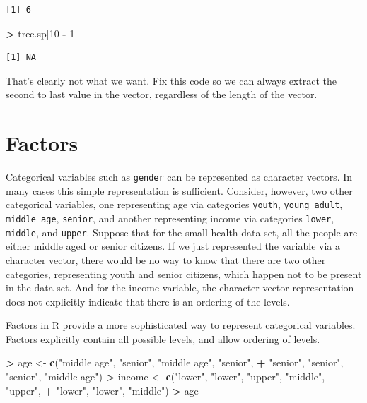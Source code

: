 \documentclass[]{krantz}
\makeatletter
\newenvironment{Shaded}{\begin{snugshade}}{\end{snugshade}}
\newcommand{\DecValTok}[1]{\textcolor[rgb]{0.06,0.06,0.06}{#1}}
\newcommand{\KeywordTok}[1]{\textcolor[rgb]{0.27,0.27,0.27}{\textbf{#1}}}
\newcommand{\NormalTok}[1]{#1}
\newcommand{\OperatorTok}[1]{\textcolor[rgb]{0.43,0.43,0.43}{\textbf{#1}}}
\newcommand{\StringTok}[1]{\textcolor[rgb]{0.5,0.5,0.5}{#1}}
\newenvironment{kframe}{%
\medskip{}
\setlength{\fboxsep}{.8em}
 \def\at@end@of@kframe{}%
 \ifinner\ifhmode%
  \def\at@end@of@kframe{\end{minipage}}%
  \begin{minipage}{\columnwidth}%
 \fi\fi%
 \def\FrameCommand##1{\hskip\@totalleftmargin \hskip-\fboxsep
 \colorbox{shadecolor}{##1}\hskip-\fboxsep
     \hskip-\linewidth \hskip-\@totalleftmargin \hskip\columnwidth}%
 \MakeFramed {\advance\hsize-\width
   \@totalleftmargin\z@ \linewidth\hsize
   \@setminipage}}%
 {\par\unskip\endMakeFramed%
 \at@end@of@kframe}
\renewenvironment{Shaded}{\begin{kframe}}{\end{kframe}}
\makeatother
\begin{document}
\begin{verbatim}
[1] 6
\end{verbatim}

\begin{Shaded}
\begin{Highlighting}[]
\OperatorTok{>}\StringTok{ }\NormalTok{tree.sp[}\DecValTok{10} \OperatorTok{-}\StringTok{ }\DecValTok{1}\NormalTok{]}
\end{Highlighting}
\end{Shaded}

\begin{verbatim}
[1] NA
\end{verbatim}

That's clearly not what we want. Fix this code so we can always extract the second to last value in the vector, regardless of the length of the vector.

\hypertarget{factors}{%
\section{Factors}\label{factors}}

Categorical variables such as \texttt{gender} can be represented as character vectors. In many cases this simple representation is sufficient. Consider, however, two other categorical variables, one representing age via categories \texttt{youth}, \texttt{young\ adult}, \texttt{middle\ age}, \texttt{senior}, and another representing income via categories \texttt{lower}, \texttt{middle}, and \texttt{upper}. Suppose that for the small health data set, all the people are either middle aged or senior citizens. If we just represented the variable via a character vector, there would be no way to know that there are two other categories, representing youth and senior citizens, which happen not to be present in the data set. And for the income variable, the character vector representation does not explicitly indicate that there is an ordering of the levels.

Factors in R provide a more sophisticated way to represent categorical variables. Factors explicitly contain all possible levels, and allow ordering of levels.

\begin{Shaded}
\begin{Highlighting}[]
\OperatorTok{>}\StringTok{ }\NormalTok{age <-}\StringTok{ }\KeywordTok{c}\NormalTok{(}\StringTok{"middle age"}\NormalTok{, }\StringTok{"senior"}\NormalTok{, }\StringTok{"middle age"}\NormalTok{, }\StringTok{"senior"}\NormalTok{, }
\OperatorTok{+}\StringTok{          "senior"}\NormalTok{, }\StringTok{"senior"}\NormalTok{, }\StringTok{"senior"}\NormalTok{, }\StringTok{"middle age"}\NormalTok{)}
\OperatorTok{>}\StringTok{ }\NormalTok{income <-}\StringTok{ }\KeywordTok{c}\NormalTok{(}\StringTok{"lower"}\NormalTok{, }\StringTok{"lower"}\NormalTok{, }\StringTok{"upper"}\NormalTok{, }\StringTok{"middle"}\NormalTok{, }\StringTok{"upper"}\NormalTok{, }
\OperatorTok{+}\StringTok{             "lower"}\NormalTok{, }\StringTok{"lower"}\NormalTok{, }\StringTok{"middle"}\NormalTok{)}
\OperatorTok{>}\StringTok{ }\NormalTok{age}
\end{Highlighting}
\end{Shaded}
\end{document}
